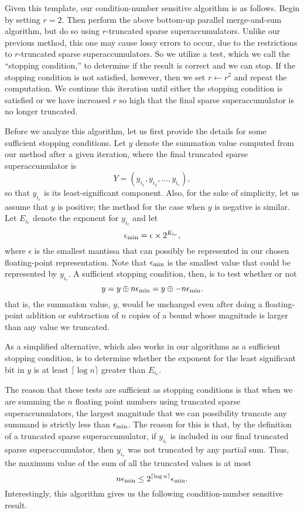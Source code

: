 \documentclass[11pt]{article}
\begin{document}
Given this template, our condition-number sensitive 
algorithm is as follows.
Begin by setting $r=2$.
Then perform the above bottom-up parallel 
merge-and-sum algorithm, but do so using
$r$-truncated sparse superaccumulators.
Unlike our previous method, this one may cause lossy errors to occur, due to
the restrictions to $r$-truncated sparse superaccumulators.
So we utilize a test, which we call the ``stopping condition,''
to determine if the result is correct and we can stop.
If the stopping condition is not satisfied, however, then we 
set $r\leftarrow r^2$ and repeat the computation.
We continue this iteration until either the stopping condition is satisfied
or we have increased $r$ so high that the final sparse superaccumulator is no
longer truncated.

Before we analyze this algorithm, let us first
provide the details for some sufficient stopping conditions.
Let $y$ denote the summation value computed from our method after a given 
iteration, where the final truncated
sparse superaccumulator is 
\[
Y=(y_{i_1},y_{i_2},\ldots,y_{i_r}),
\]
so that $y_{i_r}$ is its least-significant component.
Also, for the sake of simplicity, let us assume that $y$ is positive; the
method for the case when $y$ is negative is similar.
Let $E_{i_r}$ denote the exponent for $y_{i_r}$ 
and let
\[
\epsilon_{\rm min} = \epsilon \times 2^{E_{i_r}},
\]
where $\epsilon$ is the smallest mantissa that can possibly be represented 
in our chosen floating-point representation.
Note that $\epsilon_{\rm min}$
is the smallest value that could be represented by $y_{i_r}$.
A sufficient stopping condition, then, is to test whether or not
\[
y = y \oplus n\epsilon_{\rm min} = y \oplus -n\epsilon_{\rm min}.
\]
that is, the summation value, $y$, would be unchanged even after 
doing a floating-point addition or subtraction
of $n$ copies of a bound whose magnitude is larger than any value we truncated.

As a simplified alternative, which also works in our algorithms
as a sufficient stopping condition, is to
determine whether the exponent for the least
significant bit in $y$ is at least $\lceil \log n\rceil$ greater
than $E_{i_r}$.

The reason that these tests are sufficient as stopping
conditions is that when we are summing the $n$ floating point numbers using
truncated sparse superaccumulators, the largest magnitude
that we can possibility 
truncate any summand is strictly less than $\epsilon_{\rm min}$.
The reason for this is that,
by the definition of a truncated sparse superaccumulator,
if $y_{i_r}$ is included in our final truncated sparse superaccumulator,
then $y_{i_r}$ was not truncated by any partial sum.
Thus, the maximum value of the sum of all the truncated values is at most 
\[
n \epsilon_{\rm min} \le 2^{\lceil \log n\rceil} \epsilon_{\rm min}.
\]
Interestingly, this algorithm gives us the following condition-number
sensitive result.
\end{document}
